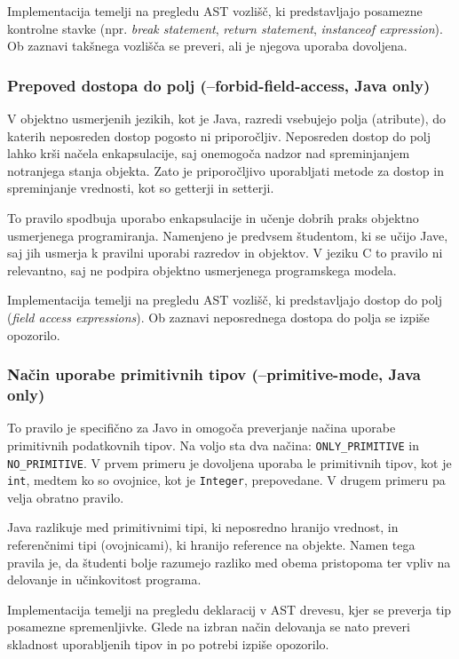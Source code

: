 \documentclass[a4paper,12pt,openright]{book}
\begin{document}
Implementacija temelji na pregledu AST vozlišč, ki predstavljajo posamezne kontrolne stavke (npr. \textit{break statement}, \textit{return statement}, \textit{instanceof expression}). Ob zaznavi takšnega vozlišča se preveri, ali je njegova uporaba dovoljena.

\subsubsection{Prepoved dostopa do polj (--forbid-field-access, Java only)}

V objektno usmerjenih jezikih, kot je Java, razredi vsebujejo polja (atribute), do katerih neposreden dostop pogosto ni priporočljiv. Neposreden dostop do polj lahko krši načela enkapsulacije, saj onemogoča nadzor nad spreminjanjem notranjega stanja objekta. Zato je priporočljivo uporabljati metode za dostop in spreminjanje vrednosti, kot so getterji in setterji.

To pravilo spodbuja uporabo enkapsulacije in učenje dobrih praks objektno usmerjenega programiranja. Namenjeno je predvsem študentom, ki se učijo Jave, saj jih usmerja k pravilni uporabi razredov in objektov. V jeziku C to pravilo ni relevantno, saj ne podpira objektno usmerjenega programskega modela.

Implementacija temelji na pregledu AST vozlišč, ki predstavljajo dostop do polj (\textit{field access expressions}). Ob zaznavi neposrednega dostopa do polja se izpiše opozorilo.

\subsubsection{Način uporabe primitivnih tipov (--primitive-mode, Java only)}

To pravilo je specifično za Javo in omogoča preverjanje načina uporabe primitivnih podatkovnih tipov. Na voljo sta dva načina: \texttt{ONLY\_PRIMITIVE} in \texttt{NO\_PRIMITIVE}. V prvem primeru je dovoljena uporaba le primitivnih tipov, kot je \texttt{int}, medtem ko so ovojnice, kot je \texttt{Integer}, prepovedane. V drugem primeru pa velja obratno pravilo.

Java razlikuje med primitivnimi tipi, ki neposredno hranijo vrednost, in referenčnimi tipi (ovojnicami), ki hranijo reference na objekte. Namen tega pravila je, da študenti bolje razumejo razliko med obema pristopoma ter vpliv na delovanje in učinkovitost programa.

Implementacija temelji na pregledu deklaracij v AST drevesu, kjer se preverja tip posamezne spremenljivke. Glede na izbran način delovanja se nato preveri skladnost uporabljenih tipov in po potrebi izpiše opozorilo.
\end{document}

